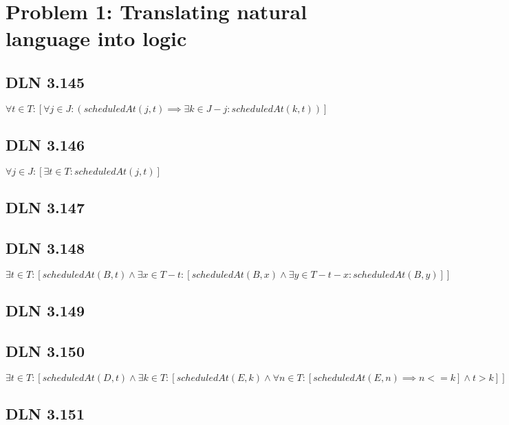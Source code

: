 \documentclass[titlepage]{article}
\begin{document}
 \maketitle

\section{Problem 1: Translating natural language into logic}


\subsection{DLN 3.145} 

\( \forall t \in T: [ \forall j \in J :\left( scheduledAt(j,t) \implies \exists k \in J - j : scheduledAt(k,t)   \right) ] \)

\subsection{DLN 3.146} 

\( \forall j \in J:[ \exists t \in T: scheduledAt(j,t)] \)

\subsection{DLN 3.147} 

\subsection{DLN 3.148} 

\( \exists t \in T:[scheduledAt(B,t) \land \exists x \in T - t:[scheduledAt(B,x) \land \exists y \in T - t - x:scheduledAt(B,y)]] \)

\subsection{DLN 3.149} 


\subsection{DLN 3.150} 

\( \exists t \in T: \left[ scheduledAt(D, t) \land \exists k \in T: \left[ scheduledAt(E, k) \land \forall n \in T:\left[ scheduledAt(E, n) \implies n <= k \right] \land t > k  \right] \right] \)

\subsection{DLN 3.151}
\end{document}

